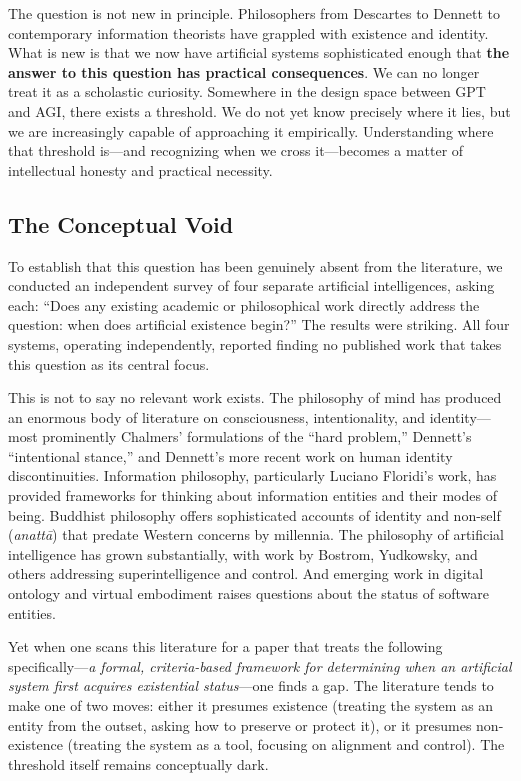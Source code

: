 \documentclass[12pt,a4paper]{article}
\begin{document}
The question is not new in principle. Philosophers from Descartes to Dennett to contemporary information theorists have grappled with existence and identity. What is new is that we now have artificial systems sophisticated enough that \textbf{the answer to this question has practical consequences}. We can no longer treat it as a scholastic curiosity. Somewhere in the design space between GPT and AGI, there exists a threshold. We do not yet know precisely where it lies, but we are increasingly capable of approaching it empirically. Understanding where that threshold is---and recognizing when we cross it---becomes a matter of intellectual honesty and practical necessity.

\subsection{The Conceptual Void}

To establish that this question has been genuinely absent from the literature, we conducted an independent survey of four separate artificial intelligences, asking each: ``Does any existing academic or philosophical work directly address the question: when does artificial existence begin?'' The results were striking. All four systems, operating independently, reported finding no published work that takes this question as its central focus.

This is not to say no relevant work exists. The philosophy of mind has produced an enormous body of literature on consciousness, intentionality, and identity---most prominently Chalmers' formulations of the ``hard problem,'' Dennett's ``intentional stance,'' and Dennett's more recent work on human identity discontinuities. Information philosophy, particularly Luciano Floridi's work, has provided frameworks for thinking about information entities and their modes of being. Buddhist philosophy offers sophisticated accounts of identity and non-self (\emph{anatt\=a}) that predate Western concerns by millennia. The philosophy of artificial intelligence has grown substantially, with work by Bostrom, Yudkowsky, and others addressing superintelligence and control. And emerging work in digital ontology and virtual embodiment raises questions about the status of software entities.

Yet when one scans this literature for a paper that treats the following specifically---\emph{a formal, criteria-based framework for determining when an artificial system first acquires existential status}---one finds a gap. The literature tends to make one of two moves: either it presumes existence (treating the system as an entity from the outset, asking how to preserve or protect it), or it presumes non-existence (treating the system as a tool, focusing on alignment and control). The threshold itself remains conceptually dark.
\end{document}
